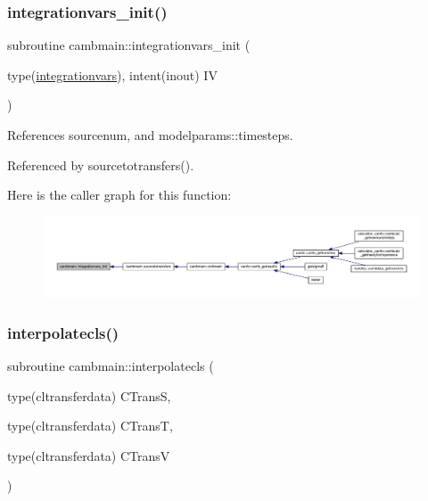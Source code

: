 \subsubsection{\texorpdfstring{integrationvars\+\_\+init()}{integrationvars\_init()}}
{\footnotesize\ttfamily subroutine cambmain\+::integrationvars\+\_\+init (\begin{DoxyParamCaption}\item[{type(\mbox{\hyperlink{structcambmain_1_1integrationvars}{integrationvars}}), intent(inout)}]{IV }\end{DoxyParamCaption})\hspace{0.3cm}{\ttfamily [private]}}



References sourcenum, and modelparams\+::timesteps.



Referenced by sourcetotransfers().

Here is the caller graph for this function\+:
\nopagebreak
\begin{figure}[H]
\begin{center}
\leavevmode
\includegraphics[width=350pt]{namespacecambmain_af5b8d9ce147ddcd3fb33ee015b43b284_icgraph}
\end{center}
\end{figure}
\mbox{\label{namespacecambmain_a411e6e866cbb05f2ba3f7164f8e04a67}} 
\subsubsection{\texorpdfstring{interpolatecls()}{interpolatecls()}}
{\footnotesize\ttfamily subroutine cambmain\+::interpolatecls (\begin{DoxyParamCaption}\item[{type(cltransferdata)}]{C\+TransS,  }\item[{type(cltransferdata)}]{C\+TransT,  }\item[{type(cltransferdata)}]{C\+TransV }\end{DoxyParamCaption})\hspace{0.3cm}{\ttfamily [private]}}



